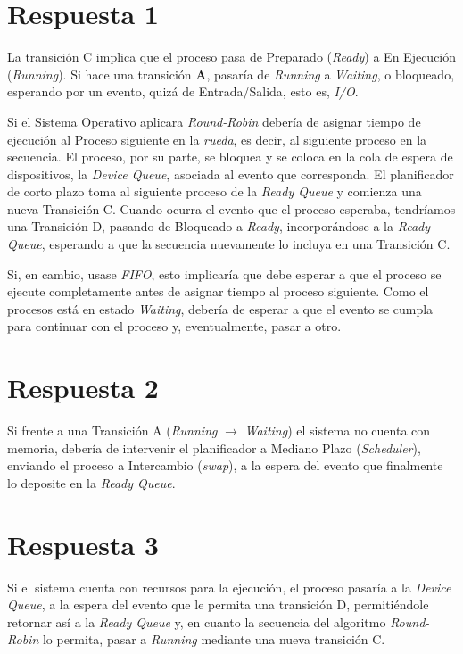 \documentclass[11pt]{article}
\begin{document}


\pagebreak

\section*{Respuesta 1}

La transición C implica que el proceso pasa de Preparado (\emph{Ready}) a En 
Ejecución (\emph{Running}). Si hace una transición \textbf{A}, pasaría de
\emph{Running} a \emph{Waiting}, o bloqueado, esperando por un evento, quizá de
Entrada/Salida, esto es, \emph{I/O}.

Si el Sistema Operativo aplicara \emph{Round-Robin} debería de asignar tiempo de 
ejecución al Proceso siguiente en la \emph{rueda}, es decir, al siguiente
proceso en la secuencia. El proceso, por su parte, se bloquea y se coloca en la 
cola de espera de dispositivos, la \emph{Device Queue}, asociada al evento que 
corresponda. El planificador de corto plazo toma al siguiente proceso de la 
\emph{Ready Queue} y comienza una nueva Transición C. Cuando ocurra el evento 
que el proceso esperaba, tendríamos una Transición D, pasando de Bloqueado a 
\emph{Ready}, incorporándose a la \emph{Ready Queue}, esperando a que la
secuencia nuevamente lo incluya en una Transición C.

Si, en cambio, usase \emph{FIFO}, esto implicaría que debe esperar a que el 
proceso se ejecute completamente antes de asignar tiempo al proceso siguiente.
Como el procesos está en estado \emph{Waiting}, debería de esperar a que el 
evento se cumpla para continuar con el proceso y, eventualmente, pasar a otro.

\section*{Respuesta 2}

Si frente a una Transición A (\emph{Running} $\to$ \emph{Waiting}) el sistema no 
cuenta con memoria, debería de intervenir el planificador a Mediano Plazo
(\emph{Scheduler}), enviando el proceso a Intercambio (\emph{swap}), a la espera 
del evento que finalmente lo deposite en la \emph{Ready Queue}.

\section*{Respuesta 3}

Si el sistema cuenta con recursos para la ejecución, el proceso pasaría a la 
\emph{Device Queue}, a la espera del evento que le permita una transición D, 
permitiéndole retornar así a la \emph{Ready Queue} y, en cuanto la secuencia 
del algoritmo \emph{Round-Robin} lo permita, pasar a \emph{Running} mediante una 
nueva transición C.
\end{document}
